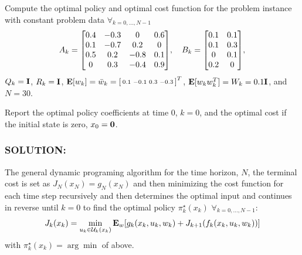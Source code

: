 \documentclass[]{article}
\newcommand{\Solution}{\subsubsection*{\textbf{SOLUTION:}}}
\begin{document}
Compute the optimal policy and optimal cost function for the problem instance with constant problem data $\forall_{k=0,\dots,N-1}$ \[
    A_k = \mqty[
        0.4 & -0.3 & 0 & 0.6\\
        0.1 & -0.7 & 0.2 & 0\\
        0.5 & 0.2 &-0.8 & 0.1\\
        0 & 0.3 & -0.4 & 0.9
    ], \quad 
    B_k = \mqty[
        0.1 & 0.1\\
        0.1 & 0.3\\
        0 & 0.1\\
        0.2 & 0
    ],
\]
$Q_k = \vb{I}$, $R_k = \vb{I}$, $\mathbf{E} [w_k] = \bar{w}_k = \smqty[0.1&-0.1&0.3&-0.3]^T$, $\mathbf{E}[w_k w_k^T] = W_k = 0.1 \vb{I}$, and $N = 30$.

Report the optimal policy coefficients at time 0, $k=0$, and the optimal cost if the initial state is zero, $x_0 = \vb{0}$.

\Solution
The general dynamic programing algorithm for the time horizon, $N$, the terminal cost is set as $J_N(x_N) = g_{N}(x_N)$ and then minimizing the cost function for each time step recursively and then determines the optimal input and continues in reverse until $k=0$ to find the optimal policy $\pi_{k}^{\star}(x_k)$ $\forall_{k=0,\dots,N-1}$:\[
    J_k(x_k) = \min_{u_k \in \mathcal{U}_k(x_k)} \vb{E}_w[
        g_k(x_k,u_k,w_k) + J_{k+1}(f_k(x_k,u_k,w_k))
        ]
\] with $\pi_{k}^{\star}(x_k) = \arg \min$ of above.
\end{document}
